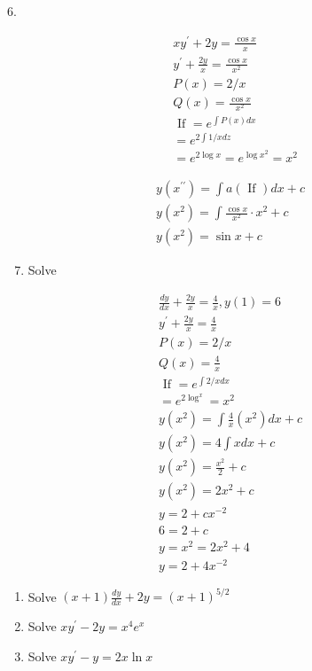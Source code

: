 \documentclass[10pt]{article}
\begin{document}
6.

$$
\begin{aligned}
& x y^{\prime}+2 y=\frac{\cos x}{x} \\
& y^{\prime}+\frac{2 y}{x}=\frac{\cos x}{x^{2}} \\
& P(x)=2 / x \\
& Q(x)=\frac{\cos x}{x^{2}} \\
& \text { If }=e^{\int P(x) d x} \\
& =e^{2 \int 1 / x d z} \\
& =e^{2 \log x}=e^{\log x^{2}}=x^{2}
\end{aligned}
$$

$$
\begin{gathered}
y\left(x^{\prime \prime}\right)=\int a(\text { If }) d x+c \\
y\left(x^{2}\right)=\int \frac{\cos x}{x^{2}} \cdot x^{2}+c \\
y\left(x^{2}\right)=\sin x+c
\end{gathered}
$$

\begin{enumerate}
  \setcounter{enumi}{6}
  \item Solve
\end{enumerate}

$$
\begin{gathered}
\frac{d y}{d x}+\frac{2 y}{x}=\frac{4}{x}, y(1)=6 \\
y^{\prime}+\frac{2 y}{x}=\frac{4}{x} \\
P(x)=2 / x \\
Q(x)=\frac{4}{x} \\
\text { If }=e^{\int 2 / x d x} \\
=e^{2 \log ^{x}}=x^{2} \\
y\left(x^{2}\right)=\int \frac{4}{x}\left(x^{2}\right) d x+c \\
y\left(x^{2}\right)=4 \int x d x+c \\
y\left(x^{2}\right)=\frac{x^{2}}{2}+c \\
y\left(x^{2}\right)=2 x^{2}+c \\
y=2+c x^{-2} \\
6=2+c \\
y=x^{2}=2 x^{2}+4 \\
y=2+4 x^{-2}
\end{gathered}
$$

\begin{enumerate}
  \item Solve $(x+1) \frac{d y}{d x}+2 y=(x+1)^{5 / 2}$

  \item Solve $x y^{\prime}-2 y=x^{4} e^{x}$

  \item Solve $x y^{\prime}-y=2 x \ln x$

\end{enumerate}
\end{document}

